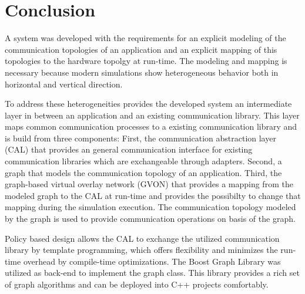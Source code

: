 \chapter{Conclusion}
\label{sec:conclusion}




A system was developed with the requirements for an explicit modeling
of the communication topologies of an application and an explicit
mapping of this topologies to the hardware topolgy at run-time. The
modeling and mapping is necessary because modern simulations show
heterogeneous behavior both in horizontal and vertical direction.

To address these heterogeneities provides the developed system an
intermediate layer in between an application and an existing
communication library.  This layer maps common communication processes to a
existing communication library and is build from three components:
First, the communication abstraction layer (CAL) that provides an
general communication interface for existing communication libraries
which are exchangeable through adapters.  Second, a graph that models
the communication topology of an application.  Third, the graph-based
virtual overlay network (GVON) that provides a mapping from the
modeled graph to the CAL at run-time and provides the possibilty to
change that mapping during the simulation execution.  The
communication topology modeled by the graph is used to provide
communication operations on basis of the graph.

Policy based design allows the CAL to exchange the utilized
communication library by template programming, which offers
flexibility and minimizes the run-time overhead by compile-time
optimizations.  The Boost Graph Library was utilized as back-end to
implement the graph class. This library provides a rich set of graph
algorithms and can be deployed into C++ projects comfortably.

